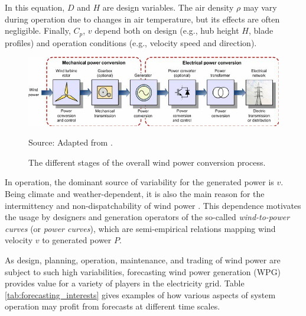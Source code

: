 In this equation, $D$ and $H$ are design variables. The air density $\rho$ may vary during operation due to changes in air temperature, but its effects are often negligible. Finally, $C_p$, $v$ depend both on design (e.g., hub height $H$, blade profiles) and operation conditions (e.g., velocity speed and direction).
\begin{figure}[H] %
   \centering
    \caption{ The different stages of the overall wind power conversion process. }
    \includegraphics[scale=0.6]{wind_power_conversion_stages.png} \\
    \raggedright
    Source: Adapted from \cite{molina2011modelling}.
   \label{fig:wind_power_conversion_stages}
\end{figure}


In operation, the dominant source of variability for the generated power is $v$.
Being climate and weather-dependent, it is also the main reason for the intermittency and non-dispatchability of wind power \cite{demeo2006natural}.
This dependence motivates the usage by designers and generation operators of the so-called \textit{wind-to-power curves} (or \textit{power curves}), which are semi-empirical relations mapping wind velocity $v$ to generated power $P$.

As design, planning, operation, maintenance, and trading of wind power are subject to such high variabilities, forecasting wind power generation (WPG) provides value for a variety of players in the electricity grid.
Table \ref{tab:forecasting_interests} gives examples of how various aspects of system operation may profit from forecasts at different time scales.

